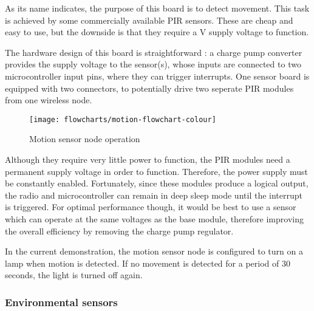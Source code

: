 
As its name indicates, the purpose of this board is to detect movement. This
task is achieved by some commercially available PIR sensors. These are cheap and
easy to use, but the downside is that they require a \unit[5]{V} supply voltage
to function.

The hardware design of this board is straightforward : a charge pump converter
provides the supply voltage to the sensor(s), whose inputs are connected to two
microcontroller input pins, where they can trigger interrupts. One sensor board
is equipped with two connectors, to potentially drive two seperate PIR modules
from one wireless node.


\begin{figure}[!h]
  \begin{center}
    \texttt{[image: flowcharts/motion-flowchart-colour]}
  \end{center}
  \caption{Motion sensor node operation}
  \label{fig:motion-flowchart}
\end{figure}

Although they require very little power to function, the PIR modules need a
permanent supply voltage in order to function. Therefore, the power supply must
be constantly enabled. Fortunately, since these modules produce a logical
output, the radio and microcontroller can remain in deep sleep mode until the
interrupt is triggered. For optimal performance though, it would be best to use
a sensor which can operate at the same voltages as the base module, therefore
improving the overall efficiency by removing the charge pump regulator.


In the current demonstration, the motion sensor node is configured to turn on a
lamp when motion is detected. If no movement is detected for a period of 30
seconds, the light is turned off again.


\subsubsection{Environmental sensors}

